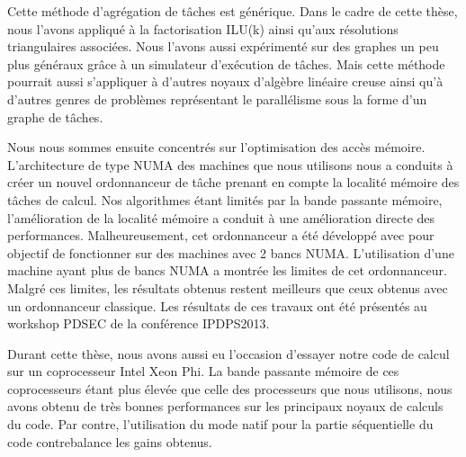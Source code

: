 Cette méthode d'agrégation de tâches est générique.
%
Dans le cadre de cette thèse, nous l'avons appliqué à la factorisation ILU(k) ainsi qu'aux résolutions triangulaires associées.
%
Nous l'avons aussi expérimenté sur des graphes un peu plus généraux grâce à un simulateur d'exécution de tâches.
%
Mais cette méthode pourrait aussi s'appliquer à d'autres noyaux d'algèbre linéaire creuse ainsi qu'à d'autres genres de problèmes représentant le parallélisme sous la forme d'un graphe de tâches.



Nous nous sommes ensuite concentrés sur l'optimisation des accès mémoire.
%
L'architecture de type NUMA des machines que nous utilisons nous a conduits à créer un nouvel ordonnanceur de tâche prenant en compte la localité mémoire des tâches de calcul.
%
Nos algorithmes étant limités par la bande passante mémoire, l'amélioration de la localité mémoire a conduit à une amélioration directe des performances.
%
Malheureusement, cet ordonnanceur a été développé avec pour objectif de fonctionner sur des machines avec 2 bancs NUMA.
%
L'utilisation d'une machine ayant plus de bancs NUMA a montrée les limites de cet ordonnanceur.
%
Malgré ces limites, les résultats obtenus restent meilleurs que ceux obtenus avec un ordonnanceur classique.
%
Les résultats de ces travaux ont été présentés au workshop PDSEC de la conférence IPDPS2013.


Durant cette thèse, nous avons aussi eu l'occasion d'essayer notre code de calcul sur un coprocesseur Intel Xeon Phi.
%
La bande passante mémoire de ces coprocesseurs étant plus élevée que celle des processeurs que nous utilisons, nous avons obtenu de très bonnes performances sur les principaux noyaux de calculs du code.
%
Par contre, l'utilisation du mode natif pour la partie séquentielle du code contrebalance les gains obtenus.
